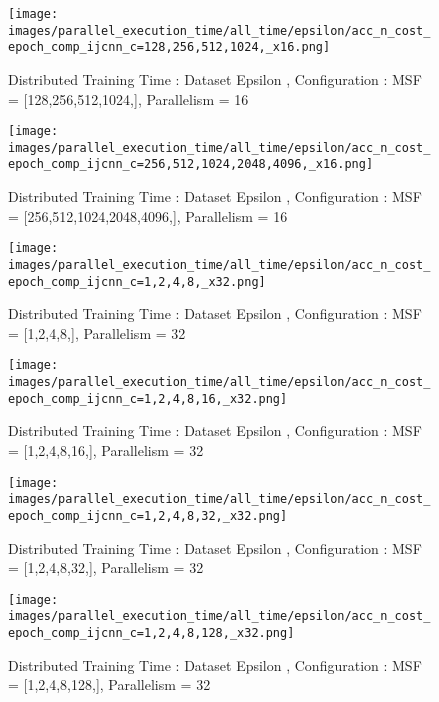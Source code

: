 \begin{figure*}[htbp]
\centering
\texttt{[image: images/parallel\_execution\_time/all\_time/epsilon/acc\_n\_cost\_epoch\_comp\_ijcnn\_c=128,256,512,1024,\_x16.png]}
\caption{Distributed Training Time : Dataset Epsilon , Configuration : MSF = [128,256,512,1024,], Parallelism = 16}
\label{fig:dis-msf-tr-time-epsilon-x16}
\end{figure*}


\begin{figure*}[htbp]
\centering
\texttt{[image: images/parallel\_execution\_time/all\_time/epsilon/acc\_n\_cost\_epoch\_comp\_ijcnn\_c=256,512,1024,2048,4096,\_x16.png]}
\caption{Distributed Training Time : Dataset Epsilon , Configuration : MSF = [256,512,1024,2048,4096,], Parallelism = 16}
\label{fig:dis-msf-tr-time-epsilon-x16}
\end{figure*}


\begin{figure*}[htbp]
\centering
\texttt{[image: images/parallel\_execution\_time/all\_time/epsilon/acc\_n\_cost\_epoch\_comp\_ijcnn\_c=1,2,4,8,\_x32.png]}
\caption{Distributed Training Time : Dataset Epsilon , Configuration : MSF = [1,2,4,8,], Parallelism = 32}
\label{fig:dis-msf-tr-time-epsilon-x32}
\end{figure*}


\begin{figure*}[htbp]
\centering
\texttt{[image: images/parallel\_execution\_time/all\_time/epsilon/acc\_n\_cost\_epoch\_comp\_ijcnn\_c=1,2,4,8,16,\_x32.png]}
\caption{Distributed Training Time : Dataset Epsilon , Configuration : MSF = [1,2,4,8,16,], Parallelism = 32}
\label{fig:dis-msf-tr-time-epsilon-x32}
\end{figure*}


\begin{figure*}[htbp]
\centering
\texttt{[image: images/parallel\_execution\_time/all\_time/epsilon/acc\_n\_cost\_epoch\_comp\_ijcnn\_c=1,2,4,8,32,\_x32.png]}
\caption{Distributed Training Time : Dataset Epsilon , Configuration : MSF = [1,2,4,8,32,], Parallelism = 32}
\label{fig:dis-msf-tr-time-epsilon-x32}
\end{figure*}


\begin{figure*}[htbp]
\centering
\texttt{[image: images/parallel\_execution\_time/all\_time/epsilon/acc\_n\_cost\_epoch\_comp\_ijcnn\_c=1,2,4,8,128,\_x32.png]}
\caption{Distributed Training Time : Dataset Epsilon , Configuration : MSF = [1,2,4,8,128,], Parallelism = 32}
\label{fig:dis-msf-tr-time-epsilon-x32}
\end{figure*}


